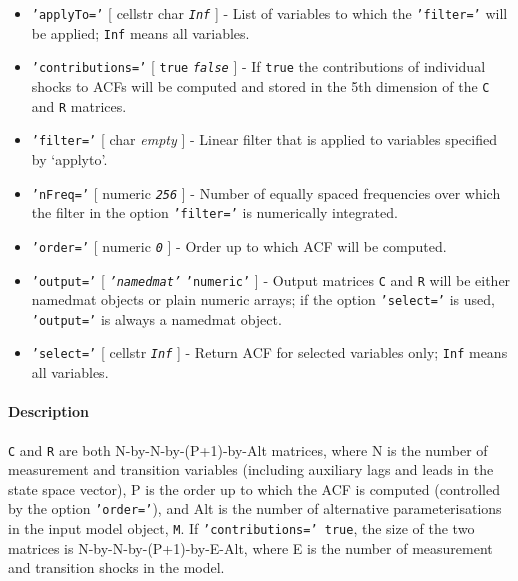  \begin{itemize}
 \item
   \texttt{'applyTo='} {[} cellstr \textbar{} char \textbar{}
   \emph{\texttt{Inf}} {]} - List of variables to which the
   \texttt{'filter='} will be applied; \texttt{Inf} means all variables.
 \item
   \texttt{'contributions='} {[} \texttt{true} \textbar{}
   \emph{\texttt{false}} {]} - If \texttt{true} the contributions of
   individual shocks to ACFs will be computed and stored in the 5th
   dimension of the \texttt{C} and \texttt{R} matrices.
 \item
   \texttt{'filter='} {[} char \textbar{} \emph{empty} {]} - Linear
   filter that is applied to variables specified by `applyto'.
 \item
   \texttt{'nFreq='} {[} numeric \textbar{} \emph{\texttt{256}} {]} -
   Number of equally spaced frequencies over which the filter in the
   option \texttt{'filter='} is numerically integrated.
 \item
   \texttt{'order='} {[} numeric \textbar{} \emph{\texttt{0}} {]} - Order
   up to which ACF will be computed.
 \item
   \texttt{'output='} {[} \emph{\texttt{'namedmat'}} \textbar{}
   \texttt{'numeric'} {]} - Output matrices \texttt{C} and \texttt{R}
   will be either namedmat objects or plain numeric arrays; if the option
   \texttt{'select='} is used, \texttt{'output='} is always a namedmat
   object.
 \item
   \texttt{'select='} {[} cellstr \textbar{} \emph{\texttt{Inf}} {]} -
   Return ACF for selected variables only; \texttt{Inf} means all
   variables.
 \end{itemize}
 
 \paragraph{Description}
 
 \texttt{C} and \texttt{R} are both N-by-N-by-(P+1)-by-Alt matrices,
 where N is the number of measurement and transition variables (including
 auxiliary lags and leads in the state space vector), P is the order up
 to which the ACF is computed (controlled by the option
 \texttt{'order='}), and Alt is the number of alternative
 parameterisations in the input model object, \texttt{M}. If
 \texttt{'contributions=' true}, the size of the two matrices is
 N-by-N-by-(P+1)-by-E-Alt, where E is the number of measurement and
 transition shocks in the model.
 
